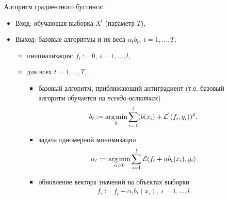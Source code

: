 \documentclass[%
	11pt,
	a4paper,
	utf8,
		]{article}
\begin{document}
Алгоритм градиентного бустинга:
\begin{itemize}
	\item Вход: обучающая выборка $ X^l $ (параметр $ T $),
	
	\item Выход: базовые алгоритмы и их веса $ \alpha_t b_t, \ t = 1, \ldots, T $,
	
	\begin{itemize}
		\item инициализация: $ f_i := 0,\  i = 1, \ldots, l $,
		
		\item для всех $ t = 1, \ldots, T $,
		
		\begin{itemize}
		
		\item базовый алгоритм, приближающий антиградиент (т.е. базовый алгоритм обучается на \emph{псевдо-остатках})
	\begin{align*}
		b_t := \underset{b}{\operatorname*{arg\,min}} \sum_{i=1}^{l} (b(x_i) + \mathcal{L}^{'}(f_i, y_i))^2,
	\end{align*}

        \item задача одномерной минимизации
        \begin{align*}
        	\alpha_t := \underset{\alpha > 0}{\operatorname*{arg\,min}} \sum_{i=1}^{l} \mathcal{L}(f_i + \alpha b_t(x_i), y_i)
        \end{align*}
    
        \item обновление вектора значений на объектах выборки
        \begin{align*}
        	f_i := f_i + \alpha_t b_t(x_i), \ i = 1, \ldots, l
        \end{align*}
    	\end{itemize}
	\end{itemize}
\end{itemize}
\end{document}
